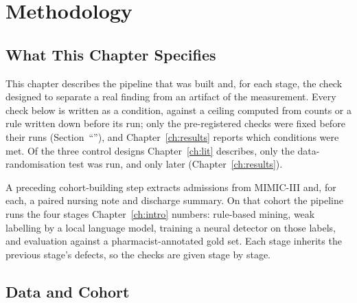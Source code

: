 %
%

\chapter{Methodology}
\label{ch:method}

\section{What This Chapter Specifies}
\label{sec:m-overview}

This chapter describes the pipeline that was built and, for each stage, the check designed to
separate a real finding from an artifact of the measurement. Every check below is written as a
condition, against a ceiling computed from counts or a rule written down before its run;
only the pre-registered checks were fixed before their runs
(Section~``''), and Chapter~\ref{ch:results} reports which conditions
were met. Of the three control designs
Chapter~\ref{ch:lit} describes, only the data-randomisation test was run, and only later
(Chapter~\ref{ch:results}).

A preceding cohort-building step extracts admissions from MIMIC-III and, for each, a paired
nursing note and discharge summary. On that cohort the pipeline runs the four stages
Chapter~\ref{ch:intro} numbers: rule-based mining, weak labelling by a local
language model, training a neural detector on those labels, and evaluation against
a pharmacist-annotated gold set. Each stage inherits the
previous stage's defects, so the checks are given stage by stage. 

\section{Data and Cohort}
\label{sec:m-data}

